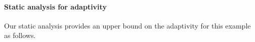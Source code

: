 
\paragraph{{Static analysis for adaptivity}}
Our static analysis provides an upper bound on the adaptivity for this example as follows.
